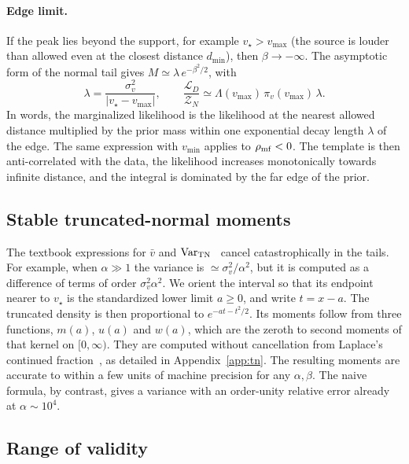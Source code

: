 \documentclass[prd,twocolumn,nofootinbib,superscriptaddress,amsmath,amssymb]{revtex4-2}
\newcommand{\rhomf}{\rho_{\rm mf}}
\newcommand{\vs}{v_\star}
\newcommand{\vmin}{v_{\min}}
\newcommand{\vmax}{v_{\max}}
\newcommand{\dmin}{d_{\min}}
\newcommand{\Lam}{\Lambda}
\newcommand{\Var}{\mathrm{Var}}
\begin{document}
\paragraph{Edge limit.}
If the peak lies beyond the support,
for example $\vs>\vmax$ (the source is louder than allowed even at the closest distance $\dmin$),
then $\beta\to-\infty$.
The asymptotic form of the normal tail gives $M\simeq\lambda\,e^{-\beta^2/2}$,
with
\begin{equation}
\lambda = \frac{\sigma_v^2}{|\vs-\vmax|},
\qquad
\frac{\mathcal{L}_D}{\mathcal{Z}_N} \simeq \Lam(\vmax)\,\pi_v(\vmax)\,\lambda.
\label{eq:edge}
\end{equation}
In words,
the marginalized likelihood is the likelihood at the nearest allowed distance multiplied by the prior mass within one exponential decay length $\lambda$ of the edge.
The same expression with $\vmin$ applies to $\rhomf<0$.
The template is then anti-correlated with the data,
the likelihood increases monotonically towards infinite distance,
and the integral is dominated by the far edge of the prior.

\subsection{Stable truncated-normal moments}

The textbook expressions for $\bar v$ and $\Var_{\rm TN}$~\cite{JohnsonKotz1994} cancel catastrophically in the tails.
For example,
when $\alpha\gg1$ the variance is $\simeq\sigma_v^2/\alpha^2$,
but it is computed as a difference of terms of order $\sigma_v^2\alpha^2$.
We orient the interval so that its endpoint nearer to $\vs$ is the standardized lower limit $a\ge0$,
and write $t = x - a$.
The truncated density is then proportional to $e^{-at-t^2/2}$.
Its moments follow from three functions,
$m(a)$,
$u(a)$ and $w(a)$,
which are the zeroth to second moments of that kernel on $[0,\infty)$.
They are computed without cancellation from Laplace's continued fraction~\cite{AbramowitzStegun1964},
as detailed in Appendix~\ref{app:tn}.
The resulting moments are accurate to within a few units of machine precision for any $\alpha,\beta$.
The naive formula,
by contrast,
gives a variance with an order-unity relative error already at $\alpha\sim10^4$.

\subsection{Range of validity}
\end{document}
